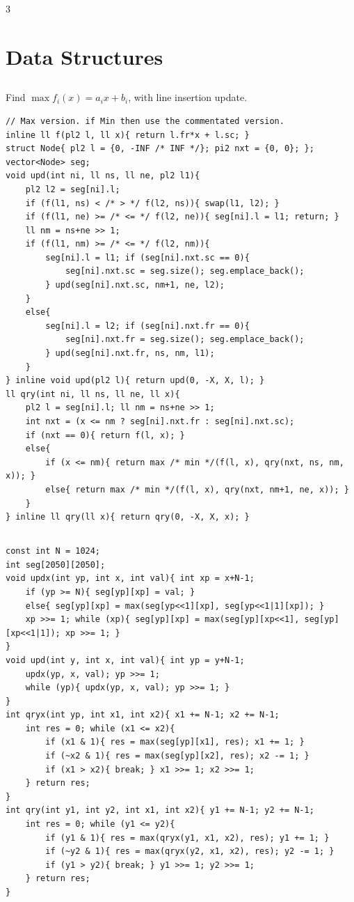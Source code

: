 \documentclass[landscape, 8pt, a4paper, oneside]{extarticle}
\begin{document}
\begin{multicols*}{3}
\section{Data Structures}
\subsection{}
Find $\max f_i(x) = a_ix + b_i$, with line insertion update.

\begin{verbatim}
// Max version. if Min then use the commentated version.
inline ll f(pl2 l, ll x){ return l.fr*x + l.sc; }
struct Node{ pl2 l = {0, -INF /* INF */}; pi2 nxt = {0, 0}; };
vector<Node> seg;
void upd(int ni, ll ns, ll ne, pl2 l1){
	pl2 l2 = seg[ni].l;
	if (f(l1, ns) < /* > */ f(l2, ns)){ swap(l1, l2); }
	if (f(l1, ne) >= /* <= */ f(l2, ne)){ seg[ni].l = l1; return; }
	ll nm = ns+ne >> 1;
	if (f(l1, nm) >= /* <= */ f(l2, nm)){
		seg[ni].l = l1; if (seg[ni].nxt.sc == 0){
			seg[ni].nxt.sc = seg.size(); seg.emplace_back();
		} upd(seg[ni].nxt.sc, nm+1, ne, l2);
	}
	else{
		seg[ni].l = l2; if (seg[ni].nxt.fr == 0){
			seg[ni].nxt.fr = seg.size(); seg.emplace_back();
		} upd(seg[ni].nxt.fr, ns, nm, l1);
	}
} inline void upd(pl2 l){ return upd(0, -X, X, l); }
ll qry(int ni, ll ns, ll ne, ll x){
	pl2 l = seg[ni].l; ll nm = ns+ne >> 1;
	int nxt = (x <= nm ? seg[ni].nxt.fr : seg[ni].nxt.sc);
	if (nxt == 0){ return f(l, x); }
	else{
		if (x <= nm){ return max /* min */(f(l, x), qry(nxt, ns, nm, x)); }
		else{ return max /* min */(f(l, x), qry(nxt, nm+1, ne, x)); }
	}
} inline ll qry(ll x){ return qry(0, -X, X, x); }
\end{verbatim}
\subsection{}
\begin{verbatim}
const int N = 1024;
int seg[2050][2050];
void updx(int yp, int x, int val){ int xp = x+N-1;
	if (yp >= N){ seg[yp][xp] = val; }
	else{ seg[yp][xp] = max(seg[yp<<1][xp], seg[yp<<1|1][xp]); }
	xp >>= 1; while (xp){ seg[yp][xp] = max(seg[yp][xp<<1], seg[yp][xp<<1|1]); xp >>= 1; }
}
void upd(int y, int x, int val){ int yp = y+N-1;
	updx(yp, x, val); yp >>= 1;
	while (yp){ updx(yp, x, val); yp >>= 1; }
}
int qryx(int yp, int x1, int x2){ x1 += N-1; x2 += N-1;
	int res = 0; while (x1 <= x2){
		if (x1 & 1){ res = max(seg[yp][x1], res); x1 += 1; }
		if (~x2 & 1){ res = max(seg[yp][x2], res); x2 -= 1; }
		if (x1 > x2){ break; } x1 >>= 1; x2 >>= 1;
	} return res;
}
int qry(int y1, int y2, int x1, int x2){ y1 += N-1; y2 += N-1;
	int res = 0; while (y1 <= y2){
		if (y1 & 1){ res = max(qryx(y1, x1, x2), res); y1 += 1; }
		if (~y2 & 1){ res = max(qryx(y2, x1, x2), res); y2 -= 1; }
		if (y1 > y2){ break; } y1 >>= 1; y2 >>= 1;
	} return res;
}
\end{verbatim}

\end{multicols*}
\end{document}
